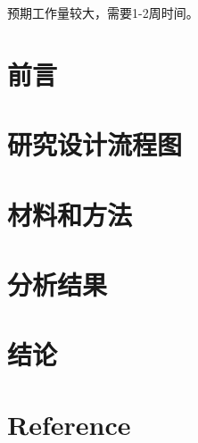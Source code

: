 \documentclass[
]{article}
\begin{document}
预期工作量较大，需要1-2周时间。

\hypertarget{introduction}{%
\section{前言}\label{introduction}}

\hypertarget{route}{%
\section{研究设计流程图}\label{route}}

\hypertarget{methods}{%
\section{材料和方法}\label{methods}}

\hypertarget{results}{%
\section{分析结果}\label{results}}

\hypertarget{dis}{%
\section{结论}\label{dis}}

\hypertarget{bibliography}{%
\section*{Reference}\label{bibliography}}
\end{document}
